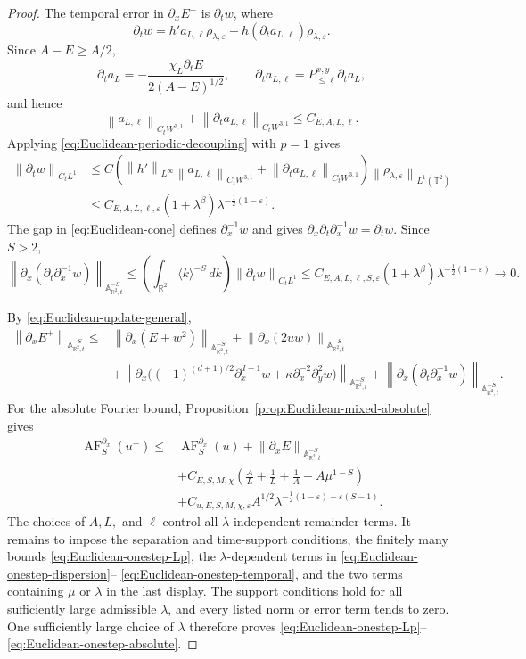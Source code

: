 \documentclass[12pt,reqno,letterpaper]{amsart}
\numberwithin{equation}{section}
\theoremstyle{definition}
\newcommand{\T}{\mathbb T}
\newcommand{\R}{\mathbb R}
\newcommand{\A}{\mathbb A}
\newcommand{\eps}{\varepsilon}
\newcommand{\la}{\lambda}
\newcommand{\norm}[1]{\left\lVert #1\right\rVert}
\begin{document}
\begin{proof}
The temporal error in $\partial_xE^+$ is $\partial_tw$, where
\[
 \partial_tw=h'a_{L,\ell}\rho_{\la,\eps}
 +h(\partial_ta_{L,\ell})\rho_{\la,\eps}.
\]
Since $A-E\geq A/2$,
\[
 \partial_ta_L=-\frac{\chi_L\partial_tE}{2(A-E)^{1/2}},
 \qquad
 \partial_ta_{L,\ell}=P_{\leq\ell}^{x,y}\partial_ta_L,
\]
and hence
\[
 \norm{a_{L,\ell}}_{C_tW^{3,1}}
 +\norm{\partial_ta_{L,\ell}}_{C_tW^{3,1}}
 \leq C_{E,A,L,\ell}.
\]
Applying \eqref{eq:Euclidean-periodic-decoupling} with $p=1$ gives
\begin{align*}
 \norm{\partial_tw}_{C_tL^1}
 &\leq C\left(\norm{h'}_{L^\infty}
       \norm{a_{L,\ell}}_{C_tW^{3,1}}
       +\norm{\partial_ta_{L,\ell}}_{C_tW^{3,1}}\right)
       \norm{\rho_{\la,\eps}}_{L^1(\T^2)}\\
 &\leq C_{E,A,L,\ell,\eps}
       (1+\la^\beta)\la^{-\frac12(1-\eps)}.
\end{align*}
The gap in \eqref{eq:Euclidean-cone} defines $\partial_x^{-1}w$ and gives
$\partial_x\partial_t\partial_x^{-1}w=\partial_tw$.  Since $S>2$,
\begin{equation}\label{eq:Euclidean-onestep-temporal}
 \norm{\partial_x(\partial_t\partial_x^{-1}w)}
      _{\A^{-S}_{\R^2,t}}
 \leq\left(\int_{\R^2}\langle k\rangle^{-S}\,dk\right)
       \norm{\partial_tw}_{C_tL^1}
 \leq C_{E,A,L,\ell,S,\eps}
       (1+\la^\beta)\la^{-\frac12(1-\eps)}
 \longrightarrow0.
\end{equation}

By \eqref{eq:Euclidean-update-general},
\begin{align*}
 \norm{\partial_xE^+}_{\A^{-S}_{\R^2,t}}
 \leq{}&\norm{\partial_x(E+w^2)}_{\A^{-S}_{\R^2,t}}
 +\norm{\partial_x(2uw)}_{\A^{-S}_{\R^2,t}}\\
 &+\norm{\partial_x\bigl((-1)^{(d+1)/2}\partial_x^{d-1}w+
       \kappa\partial_x^{-2}\partial_y^2w)}_{\A^{-S}_{\R^2,t}}
 +\norm{\partial_x(\partial_t\partial_x^{-1}w)}
       _{\A^{-S}_{\R^2,t}}.
\end{align*}
For the absolute Fourier bound, Proposition~\ref{prop:Euclidean-mixed-absolute}
gives
\begin{align*}
 \operatorname{AF}^{\partial_x}_S(u^+)
 \leq{}&\operatorname{AF}^{\partial_x}_S(u)
 +\norm{\partial_xE}_{\A^{-S}_{\R^2,t}}\\
 &+C_{E,S,M,\chi}\left(
   \frac{A}{L}+\frac1L+\frac1A+A\mu^{1-S}\right)\\
 &+C_{u,E,S,M,\chi,\eps}A^{1/2}
 \la^{-\frac12(1-\eps)-\eps(S-1)}.
\end{align*}
The choices of $A,L,$ and $\ell$ control all $\la$-independent remainder
terms.  It remains to impose the separation and time-support conditions,
the finitely many bounds \eqref{eq:Euclidean-onestep-Lp}, the
$\la$-dependent terms in
\eqref{eq:Euclidean-onestep-dispersion}--
\eqref{eq:Euclidean-onestep-temporal}, and the two terms containing
$\mu$ or $\la$ in the last display.  The support conditions hold for all
sufficiently large admissible $\la$, and every listed norm or error term
tends to zero.  One sufficiently large choice of $\la$ therefore proves
\eqref{eq:Euclidean-onestep-Lp}--
\eqref{eq:Euclidean-onestep-absolute}.

\end{proof}
\end{document}
